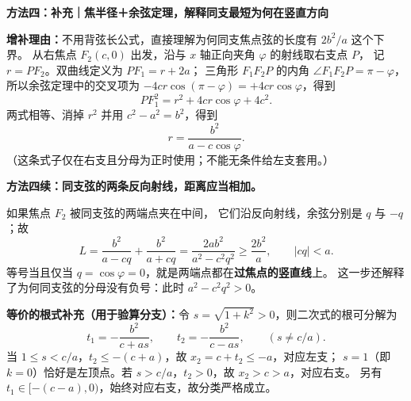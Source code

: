\clearpage
\begin{proofbox}
\textbf{方法四：补充｜焦半径＋余弦定理，解释同支最短为何在竖直方向}
\begin{center}\end{center}

\textbf{增补理由：}不用背弦长公式，直接理解为何同支焦点弦的长度有 $2b^2/a$ 这个下界。
从右焦点 $F_2(c,0)$ 出发，沿与 $x$ 轴正向夹角 $\varphi$ 的射线取右支点 $P$，
记 $r=PF_2$。双曲线定义为 $PF_1=r+2a$；
三角形 $F_1F_2P$ 的内角 $\angle F_1F_2P=\pi-\varphi$，所以余弦定理中的交叉项为
$-4cr\cos(\pi-\varphi)=+4cr\cos\varphi$，得到
\[
PF_1^2=r^2+4cr\cos\varphi+4c^2.
\]
两式相等、消掉 $r^2$ 并用 $c^2-a^2=b^2$，得到
\[
\boxed{r=\frac{b^2}{a-c\cos\varphi}}.\tag{3}
\]
（这条式子仅在右支且分母为正时使用；不能无条件给左支套用。）

\tcbbreak
\textbf{方法四续：同支弦的两条反向射线，距离应当相加。}
\begin{center}\end{center}
如果焦点 $F_2$ 被同支弦的两端点夹在中间，
它们沿反向射线，余弦分别是 $q$ 与 $-q$；故
\[
\boxed{L=\frac{b^2}{a-cq}+\frac{b^2}{a+cq}}
=\frac{2ab^2}{a^2-c^2q^2}\ge\frac{2b^2}{a},
\qquad |cq|<a.
\]
等号当且仅当 $q=\cos\varphi=0$，就是两端点都在\textbf{过焦点的竖直线}上。
这一步还解释了为何同支弦的分母没有负号：此时 $a^2-c^2q^2>0$。

\textbf{等价的根式补充（用于验算分支）：}令 $s=\sqrt{1+k^2}>0$，则二次式的根可分解为
\[
t_1=-\frac{b^2}{c+as},\qquad t_2=-\frac{b^2}{c-as},
\qquad(s\ne c/a).
\]
当 $1\le s<c/a$，$t_2\le-(c+a)$，故 $x_2=c+t_2\le-a$，对应左支；
$s=1$（即 $k=0$）恰好是左顶点。若 $s>c/a$，$t_2>0$，故 $x_2>c>a$，对应右支。
另有 $t_1\in[-(c-a),0)$，始终对应右支，故分类严格成立。
\end{proofbox}
